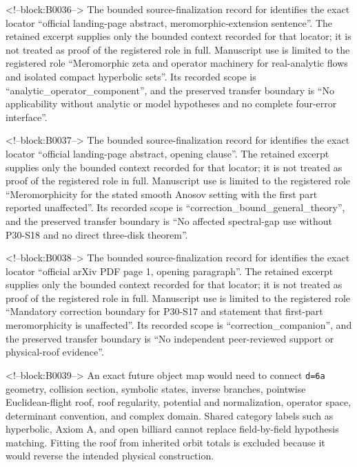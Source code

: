 \documentclass[11pt,a4paper]{article}
\begin{document}
<!--block:B0036-->
The bounded source-finalization record for \citep{P30-S16} identifies
the exact locator ``official landing-page abstract, meromorphic-extension sentence''.  The retained excerpt supplies only the
bounded context recorded for that locator; it is not treated as proof of the
registered role in full.  Manuscript use is limited to the registered role ``Meromorphic zeta and operator machinery for real-analytic flows and isolated compact hyperbolic sets''.
Its recorded scope is ``analytic\_operator\_component'', and the preserved
transfer boundary is ``No applicability without analytic or model hypotheses and no complete four-error interface''.

<!--block:B0037-->
The bounded source-finalization record for \citep{P30-S17} identifies
the exact locator ``official landing-page abstract, opening clause''.  The retained excerpt supplies only the
bounded context recorded for that locator; it is not treated as proof of the
registered role in full.  Manuscript use is limited to the registered role ``Meromorphicity for the stated smooth Anosov setting with the first part reported unaffected''.
Its recorded scope is ``correction\_bound\_general\_theory'', and the preserved
transfer boundary is ``No affected spectral-gap use without P30-S18 and no direct three-disk theorem''.

<!--block:B0038-->
The bounded source-finalization record for \citep{P30-S18} identifies
the exact locator ``official arXiv PDF page 1, opening paragraph''.  The retained excerpt supplies only the
bounded context recorded for that locator; it is not treated as proof of the
registered role in full.  Manuscript use is limited to the registered role ``Mandatory correction boundary for P30-S17 and statement that first-part meromorphicity is unaffected''.
Its recorded scope is ``correction\_companion'', and the preserved
transfer boundary is ``No independent peer-reviewed support or physical-roof evidence''.

<!--block:B0039-->
An exact future object map would need to connect \texttt{d=6a} geometry, collision section, symbolic states, inverse branches, pointwise Euclidean-flight roof, roof regularity, potential and normalization, operator space, determinant convention, and complex domain. Shared category labels such as hyperbolic, Axiom A, and open billiard cannot replace field-by-field hypothesis matching. Fitting the roof from inherited orbit totals is excluded because it would reverse the intended physical construction.
\end{document}
